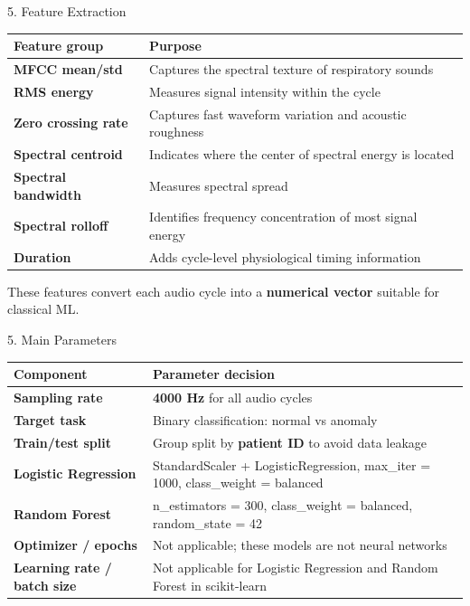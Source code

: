 \documentclass[aspectratio=169]{beamer}
\newcommand{\important}[1]{\textcolor{YachayBlue}{\textbf{#1}}}
\begin{document}
\begin{frame}{5. Feature Extraction}
\small
\renewcommand{\arraystretch}{1.25}
\begin{tabularx}{\textwidth}{>{\bfseries}p{3.0cm} X}
\toprule
Feature group & Purpose \\
\midrule
\important{MFCC mean/std} & Captures the spectral texture of respiratory sounds \\
RMS energy & Measures signal intensity within the cycle \\
Zero crossing rate & Captures fast waveform variation and acoustic roughness \\
Spectral centroid & Indicates where the center of spectral energy is located \\
Spectral bandwidth & Measures spectral spread \\
Spectral rolloff & Identifies frequency concentration of most signal energy \\
Duration & Adds cycle-level physiological timing information \\
\bottomrule
\end{tabularx}

\vspace{0.25cm}
These features convert each audio cycle into a \important{numerical vector} suitable for classical ML.
\end{frame}

\begin{frame}{5. Main Parameters}
\small
\renewcommand{\arraystretch}{1.25}
\begin{tabularx}{\textwidth}{>{\bfseries}p{3.2cm} X}
\toprule
Component & Parameter decision \\
\midrule
Sampling rate & \important{4000 Hz} for all audio cycles \\
Target task & Binary classification: normal vs anomaly \\
Train/test split & Group split by \important{patient ID} to avoid data leakage \\
Logistic Regression & StandardScaler + LogisticRegression, max\_iter = 1000, class\_weight = balanced \\
Random Forest & n\_estimators = 300, class\_weight = balanced, random\_state = 42 \\
Optimizer / epochs & Not applicable; these models are not neural networks \\
Learning rate / batch size & Not applicable for Logistic Regression and Random Forest in scikit-learn \\
\bottomrule
\end{tabularx}
\end{frame}
\end{document}
